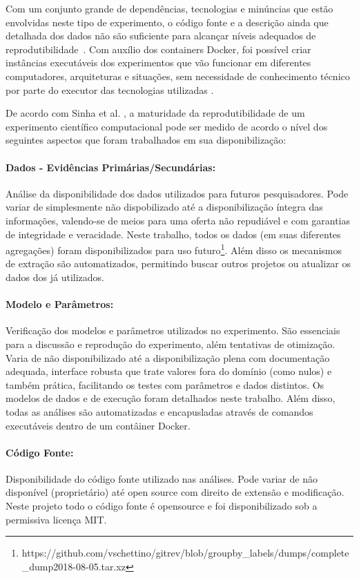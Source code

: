 \documentclass[sigconf]{acmart}
\begin{document}
Com um conjunto grande de dependências, tecnologias e minúncias que estão envolvidas neste tipo de experimento, o código fonte e a descrição ainda que detalhada dos dados não são suficiente para alcançar níveis adequados de reprodutibilidade~\cite{ince2012}. Com auxílio dos containers Docker, foi possível criar instâncias executáveis dos experimentos que vão funcionar em diferentes computadores, arquiteturas e situações, sem necessidade de conhecimento técnico por parte do executor das tecnologias utilizadas \cite{boettiger2015}.

De acordo com Sinha et al. \cite{sinha2016}, a maturidade da reprodutibilidade de um experimento científico computacional pode ser medido de acordo o nível dos seguintes aspectos que foram trabalhados em sua disponibilização:

\paragraph{Dados - Evidências Primárias/Secundárias:} Análise da disponibilidade dos dados utilizados para futuros pesquisadores. Pode variar de simplesmente não dispobilizado até a disponibilização íntegra das informações, valendo-se de meios para uma oferta não repudiável e com garantias de integridade e veracidade. Neste trabalho, todos os dados (em suas diferentes agregações) foram disponibilizados para uso futuro\footnote{https://github.com/vschettino/gitrev/blob/groupby\_labels/dumps/complete\_dump2018-08-05.tar.xz}. Além disso os mecanismos de extração são automatizados, permitindo buscar outros projetos ou atualizar os dados dos já utilizados.

\paragraph{Modelo e Parâmetros:} Verificação dos modelos e parâmetros utilizados no experimento. São essenciais para a discussão e reprodução do experimento, além tentativas de otimização. Varia de não disponibilizado até a disponibilização plena com documentação adequada, interface robusta que trate valores fora do domínio (como nulos) e também prática, facilitando os testes com parâmetros e dados distintos. Os modelos de dados e de execução foram detalhados neste trabalho. Além disso, todas as análises são automatizadas e encapusladas através de comandos executáveis dentro de um contâiner Docker.

\paragraph{Código Fonte:} Disponibilidade do código fonte utilizado nas análises. Pode variar de não disponível (proprietário) até open source com direito de extensão e modificação. Neste projeto todo o código fonte é opensource e foi disponibilizado sob a permissiva licença MIT.
\end{document}
